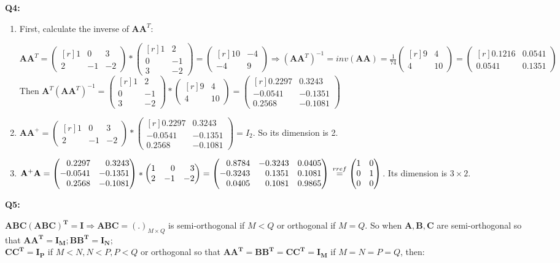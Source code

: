 \documentclass[a4paper,fleqn]{article}
\newcommand{\newvec}[1]{
    \begin{pmatrix*}[r]
        #1
    \end{pmatrix*}
}
\begin{document}
    \newpage
    \Large{\textbf{Q4:}}
    \begin{enumerate}
        \item First, calculate the inverse of $\mathbf{A}\mathbf{A}^T$:
        
        $\mathbf{A}\mathbf{A}^T=\newvec{1&0&3\\2&-1&-2}*\newvec{1&2\\0&-1\\3&-2}=\newvec{10&-4\\-4&9} 
        \Longrightarrow 
        (\mathbf{A}\mathbf{A}^T)^{-1}=inv(\mathbf{A}\mathbf{A})=\frac{1}{74}\newvec{9&4\\4&10}=\newvec{0.1216&0.0541\\0.0541&0.1351}$\\
        Then $\mathbf{A}^T(\mathbf{A}\mathbf{A}^T)^{-1}=\newvec{1&2\\0&-1\\3&-2}*\newvec{9&4\\4&10}=\newvec{0.2297&0.3243\\-0.0541&-0.1351\\0.2568&-0.1081}$

        \item $\mathbf{AA^+}=\newvec{1&0&3\\2&-1&-2}*\newvec{0.2297&0.3243\\-0.0541&-0.1351\\0.2568&-0.1081}=I_2$. So its dimension is 2. 
        
        \item $\mathbf{A^+A}=\newvec{0.2297&0.3243\\-0.0541&-0.1351\\0.2568&-0.1081}*\newvec{1&0&3\\2&-1&-2}=\newvec{0.8784&-0.3243&0.0405\\-0.3243&0.1351&0.1081\\0.0405&0.1081&0.9865} \\
        \stackrel{rref}{=} \newvec{1&0\\0&1\\0&0}$. Its dimension is $3\times 2$. 
    \end{enumerate}

    \newpage
    \Large{\textbf{Q5:}}

    \noindent $\mathbf{ABC(ABC)^T=I} \Longrightarrow \mathbf{ABC}=\mathbf{(.)}_{M\times Q}$ is semi-orthogonal if $M < Q$ or orthogonal if $M=Q$. So when $\mathbf{A, B, C}$ are semi-orthogonal so that $\mathbf{AA^T=I_M; BB^T=I_N;}$ \\ $\mathbf{CC^T=I_P}$ if $M < N, N < P, P < Q$ or orthogonal so that $\mathbf{AA^T=BB^T=CC^T=I_M}$ if $M=N=P=Q$, then:  
    
\end{document}

